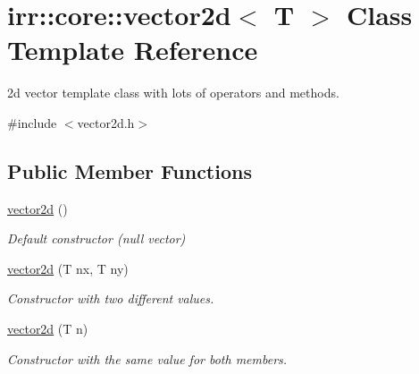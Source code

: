 \hypertarget{classirr_1_1core_1_1vector2d}{}\section{irr\+:\+:core\+:\+:vector2d$<$ T $>$ Class Template Reference}
\label{classirr_1_1core_1_1vector2d}


2d vector template class with lots of operators and methods.  




{\ttfamily \#include $<$vector2d.\+h$>$}

\subsection*{Public Member Functions}
\begin{DoxyCompactItemize}
\item 
\mbox{\label{classirr_1_1core_1_1vector2d_a72c37c85b812bdaee77a32857d12bb7f}} 
\hyperlink{classirr_1_1core_1_1vector2d_a72c37c85b812bdaee77a32857d12bb7f}{vector2d} ()
\begin{DoxyCompactList}\small\item\em Default constructor (null vector) \end{DoxyCompactList}\item 
\mbox{\label{classirr_1_1core_1_1vector2d_addeb85b77b2f8372609330c66ffe53b0}} 
\hyperlink{classirr_1_1core_1_1vector2d_addeb85b77b2f8372609330c66ffe53b0}{vector2d} (T nx, T ny)
\begin{DoxyCompactList}\small\item\em Constructor with two different values. \end{DoxyCompactList}\item 
\mbox{\label{classirr_1_1core_1_1vector2d_a88a082b80dbf6b5c221e5086fbade7e5}} 
\hyperlink{classirr_1_1core_1_1vector2d_a88a082b80dbf6b5c221e5086fbade7e5}{vector2d} (T n)
\begin{DoxyCompactList}\small\item\em Constructor with the same value for both members. \end{DoxyCompactList}\item 
\mbox{\label{classirr_1_1core_1_1vector2d_a8ebd20ef37425d42120c13aabdf63298}} 

\end{DoxyCompactItemize}
